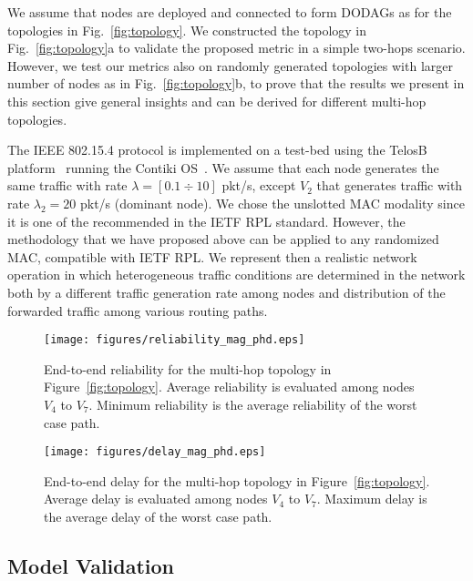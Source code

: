 \documentclass[review, 1p, 11pt]{elsarticle}
\numberwithin{equation}{section}
\begin{document}
We assume that nodes are deployed and connected to form DODAGs as for the topologies in Fig.~\ref{fig:topology}.
We constructed the topology in Fig.~\ref{fig:topology}a to validate the proposed metric in a simple two-hops scenario.
However, we test our metrics also on randomly generated topologies with larger number of nodes as in Fig.~\ref{fig:topology}b, to prove that the results we present in
this section give general insights and can be derived for different multi-hop topologies.

The IEEE 802.15.4 protocol is implemented on a test-bed
using the TelosB platform~\cite{telosb} running the Contiki OS~\cite{contiki}. We assume that each node generates the same
traffic with rate $\lambda=[0.1 \div 10]$ pkt/s, except $V_2$ that generates traffic with rate $\lambda_2=20$ pkt/s (dominant node). We chose the unslotted MAC modality since it is one of the
recommended in the IETF RPL standard. However, the methodology that we
have proposed above can
be applied to any randomized MAC, compatible with IETF RPL.
We represent then a realistic network operation in which heterogeneous traffic conditions are determined in the network both by a different traffic generation rate among nodes and distribution of the forwarded traffic among various routing paths.

\begin{figure}[t!] \centering
\texttt{[image: figures/reliability\_mag\_phd.eps]}
\caption{End-to-end reliability for the
multi-hop topology in Figure~\ref{fig:topology}. Average reliability is evaluated among nodes $V_4$ to $V_7$.
Minimum reliability is the average reliability of the worst case path. \label{fig:mh_rel_mag}}
\end{figure}
\begin{figure}[t] \centering
\texttt{[image: figures/delay\_mag\_phd.eps]}
\caption{End-to-end delay for the multi-hop
topology in Figure~\ref{fig:topology}. Average delay is evaluated among nodes $V_4$ to $V_7$.
Maximum delay is the average delay of the worst case path.\label{fig:mh_lat_mag}}
\end{figure}





\subsection{Model Validation}
\end{document}
